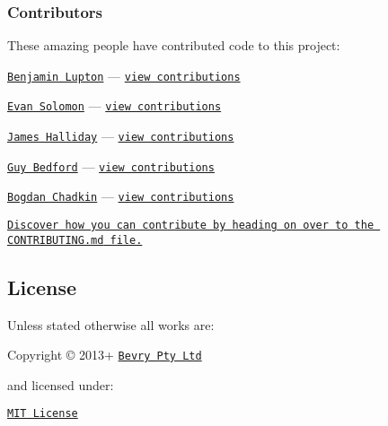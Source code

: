 \subsubsection*{Contributors}

These amazing people have contributed code to this project\+:


\begin{DoxyItemize}
\item \href{http://balupton.com}{\tt Benjamin Lupton} — \href{https://github.com/bevry/domain-browser/commits?author=balupton}{\tt view contributions} 
\item \href{http://evansolomon.me}{\tt Evan Solomon} — \href{https://github.com/bevry/domain-browser/commits?author=evansolomon}{\tt view contributions} 
\item \href{http://substack.neocities.org/}{\tt James Halliday} — \href{https://github.com/bevry/domain-browser/commits?author=substack}{\tt view contributions} 
\item \href{twitter.com/guybedford}{\tt Guy Bedford} — \href{https://github.com/bevry/domain-browser/commits?author=guybedford}{\tt view contributions} 
\item \href{https://github.com/TrySound}{\tt Bogdan Chadkin} — \href{https://github.com/bevry/domain-browser/commits?author=TrySound}{\tt view contributions}
\end{DoxyItemize}

\href{https://github.com/bevry/domain-browser/blob/master/CONTRIBUTING.md#files}{\tt Discover how you can contribute by heading on over to the {\ttfamily C\+O\+N\+T\+R\+I\+B\+U\+T\+I\+N\+G.\+md} file.}

\subsection*{License}

Unless stated otherwise all works are\+:


\begin{DoxyItemize}
\item Copyright \copyright{} 2013+ \href{http://bevry.me}{\tt Bevry Pty Ltd}
\end{DoxyItemize}

and licensed under\+:


\begin{DoxyItemize}
\item \href{http://spdx.org/licenses/MIT.html}{\tt M\+IT License}
\end{DoxyItemize}